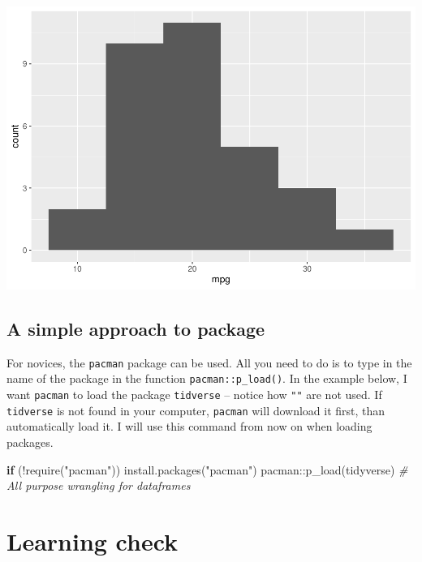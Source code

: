 \documentclass[
]{book}
\newenvironment{Shaded}{\begin{snugshade}}{\end{snugshade}}
\newcommand{\CommentTok}[1]{\textcolor[rgb]{0.56,0.35,0.01}{\textit{#1}}}
\newcommand{\ControlFlowTok}[1]{\textcolor[rgb]{0.13,0.29,0.53}{\textbf{#1}}}
\newcommand{\FunctionTok}[1]{\textcolor[rgb]{0.00,0.00,0.00}{#1}}
\newcommand{\NormalTok}[1]{#1}
\newcommand{\SpecialCharTok}[1]{\textcolor[rgb]{0.00,0.00,0.00}{#1}}
\newcommand{\StringTok}[1]{\textcolor[rgb]{0.31,0.60,0.02}{#1}}
\begin{document}
\includegraphics{se201_stats_book_files/figure-latex/unnamed-chunk-43-1.pdf}

\hypertarget{a-simple-approach-to-package}{%
\subsection{A simple approach to package}\label{a-simple-approach-to-package}}

For novices, the \texttt{pacman} package can be used. All you need to do is to type in the name of the package in the function \texttt{pacman::p\_load()}. In the example below, I want \texttt{pacman} to load the package \texttt{tidverse} -- notice how \texttt{""} are not used. If \texttt{tidverse} is not found in your computer, \texttt{pacman} will download it first, than automatically load it. I will use this command from now on when loading packages.

\begin{Shaded}
\begin{Highlighting}[]
\ControlFlowTok{if}\NormalTok{ (}\SpecialCharTok{!}\FunctionTok{require}\NormalTok{(}\StringTok{"pacman"}\NormalTok{)) }\FunctionTok{install.packages}\NormalTok{(}\StringTok{"pacman"}\NormalTok{)}
\NormalTok{pacman}\SpecialCharTok{::}\FunctionTok{p\_load}\NormalTok{(tidyverse) }\CommentTok{\# All purpose wrangling for dataframes}
\end{Highlighting}
\end{Shaded}

\hypertarget{NAVIGATE-LEARNING-CHECK}{%
\section{Learning check}\label{NAVIGATE-LEARNING-CHECK}}
\end{document}

